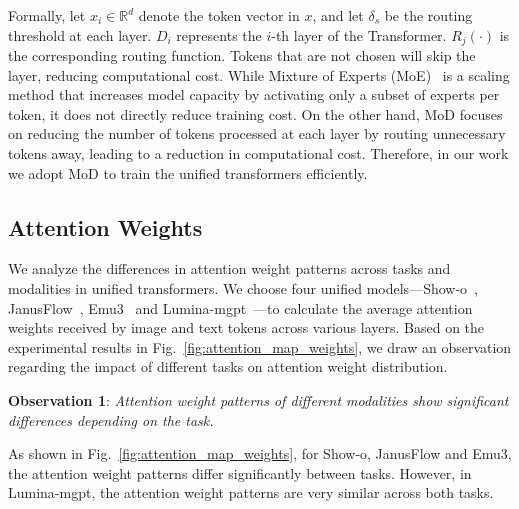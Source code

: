 Formally, let $x_i \in \mathbb{R}^d$ denote the token vector in $x$, and let $\delta_s$ be the routing threshold at each layer. $D_i$ represents the $i$-th layer of the Transformer. $R_j(\cdot)$ is the corresponding routing function. Tokens that are not chosen will skip the layer, reducing computational cost. While Mixture of Experts (MoE)~\cite{deepseekmoe} is a scaling method that increases model capacity by activating only a subset of experts per token, it does not directly reduce training cost. On the other hand, MoD focuses on reducing the number of tokens processed at each layer by routing unnecessary tokens away, leading to a reduction in computational cost. Therefore, in our work we adopt MoD to train the unified transformers efficiently.






\subsection{Attention Weights}
\label{sec:attention_map}
We analyze the differences in attention weight patterns across tasks and modalities in unified transformers. We choose four unified models—Show-o~\cite{showo}, JanusFlow~\cite{janusflow}, Emu3~\cite{emu3} and Lumina-mgpt~\cite{luminamgpt}—to calculate the average attention weights received by image and text tokens across various layers. Based on the experimental results in Fig.~\ref{fig:attention_map_weights}, we draw an observation regarding the impact of different tasks on attention weight distribution.


\textbf{Observation 1}: \textit{Attention weight patterns of different modalities show significant differences depending on the task.}



As shown in Fig.~\ref{fig:attention_map_weights}, for Show-o, JanusFlow and Emu3, the attention weight patterns differ significantly between tasks. However, in Lumina-mgpt, the attention weight patterns are very similar across both tasks.


